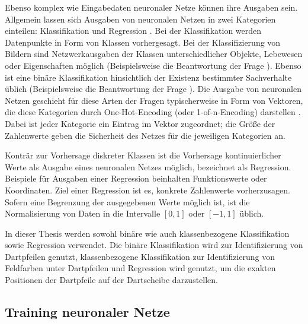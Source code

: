 Ebenso komplex wie Eingabedaten neuronaler Netze können ihre Ausgaben sein. Allgemein lassen sich Ausgaben von neuronalen Netzen in zwei Kategorien einteilen: Klassifikation und Regression \cite{nn_terminology,cv_general}.  %
Bei der Klassifikation werden Datenpunkte in Form von Klassen vorhergesagt. Bei der Klassifizierung von Bildern sind Netzwerkausgaben der Klassen unterschiedlicher Objekte, Lebewesen oder Eigenschaften möglich (Beispielsweise die Beantwortung der Frage ). Ebenso ist eine binäre Klassifikation hinsichtlich der Existenz bestimmter Sachverhalte üblich (Beispielsweise die Beantwortung der Frage ). Die Ausgabe von neuronalen Netzen geschieht für diese Arten der Fragen typischerweise in Form von Vektoren, die diese Kategorien durch One-Hot-Encoding (oder 1-of-n-Encoding) darstellen \cite{one_hot_encoding}. Dabei ist jeder Kategorie ein Eintrag im Vektor zugeordnet; die Größe der Zahlenwerte geben die Sicherheit des Netzes für die jeweiligen Kategorien an.

Konträr zur Vorhersage diskreter Klassen ist die Vorhersage kontinuierlicher Werte als Ausgabe eines neuronalen Netzes möglich, bezeichnet als Regression. Beispiele für Ausgaben einer Regression beinhalten Funktionswerte oder Koordinaten. Ziel einer Regression ist es, konkrete Zahlenwerte vorherzusagen. Sofern eine Begrenzung der ausgegebenen Werte möglich ist, ist die Normalisierung von Daten in die Intervalle $[0, 1]$ oder $[-1, 1]$ üblich.

In dieser Thesis werden sowohl binäre wie auch klassenbezogene Klassifikation sowie Regression verwendet. Die binäre Klassifikation wird zur Identifizierung von Dartpfeilen genutzt, klassenbezogene Klassifikation zur Identifizierung von Feldfarben unter Dartpfeilen und Regression wird genutzt, um die exakten Positionen der Dartpfeile auf der Dartscheibe darzustellen.



\subsection{Training neuronaler Netze}
\label{sec:was_nn_training}

